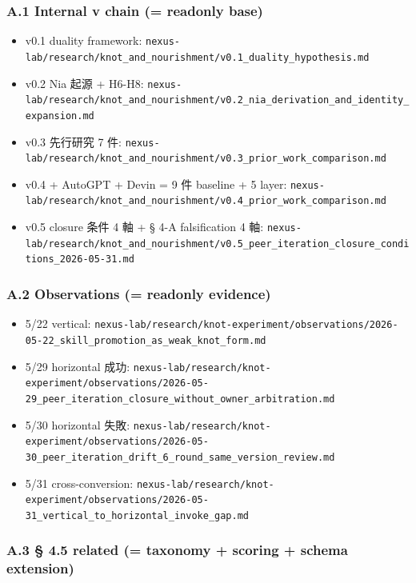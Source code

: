 \documentclass[
]{article}
\providecommand{\tightlist}{%
  \setlength{\itemsep}{0pt}\setlength{\parskip}{0pt}}
\begin{document}
\subsubsection{A.1 Internal v chain (= readonly
base)}\label{a.1-internal-v-chain-readonly-base}

\begin{itemize}
\tightlist
\item
  v0.1 duality framework:
  \texttt{nexus-lab/research/knot\_and\_nourishment/v0.1\_duality\_hypothesis.md}
\item
  v0.2 Nia 起源 + H6-H8:
  \texttt{nexus-lab/research/knot\_and\_nourishment/v0.2\_nia\_derivation\_and\_identity\_expansion.md}
\item
  v0.3 先行研究 7 件:
  \texttt{nexus-lab/research/knot\_and\_nourishment/v0.3\_prior\_work\_comparison.md}
\item
  v0.4 + AutoGPT + Devin = 9 件 baseline + 5 layer:
  \texttt{nexus-lab/research/knot\_and\_nourishment/v0.4\_prior\_work\_comparison.md}
\item
  v0.5 closure 条件 4 軸 + § 4-A falsification 4 軸:
  \texttt{nexus-lab/research/knot\_and\_nourishment/v0.5\_peer\_iteration\_closure\_conditions\_2026-05-31.md}
\end{itemize}

\subsubsection{A.2 Observations (= readonly
evidence)}\label{a.2-observations-readonly-evidence}

\begin{itemize}
\tightlist
\item
  5/22 vertical:
  \texttt{nexus-lab/research/knot-experiment/observations/2026-05-22\_skill\_promotion\_as\_weak\_knot\_form.md}
\item
  5/29 horizontal 成功:
  \texttt{nexus-lab/research/knot-experiment/observations/2026-05-29\_peer\_iteration\_closure\_without\_owner\_arbitration.md}
\item
  5/30 horizontal 失敗:
  \texttt{nexus-lab/research/knot-experiment/observations/2026-05-30\_peer\_iteration\_drift\_6\_round\_same\_version\_review.md}
\item
  5/31 cross-conversion:
  \texttt{nexus-lab/research/knot-experiment/observations/2026-05-31\_vertical\_to\_horizontal\_invoke\_gap.md}
\end{itemize}

\subsubsection{A.3 § 4.5 related (= taxonomy + scoring + schema
extension)}\label{a.3-4.5-related-taxonomy-scoring-schema-extension}
\end{document}
